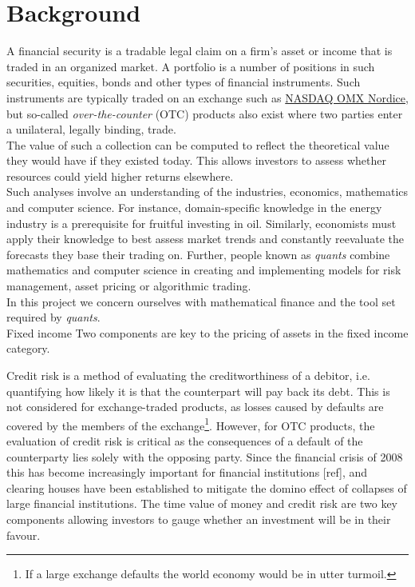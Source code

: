 \chapter{Background}

A financial security is a tradable legal claim on a firm's asset or income 
that is traded in an organized market\cite{alexander2008market}.
A portfolio is  a number of positions in such securities, equities, bonds
and other types of financial instruments. 
Such instruments are typically traded on an exchange such as 
\href{http://www.nasdaqomxnordic.com/}{NASDAQ OMX Nordice}, but so-called
\emph{over-the-counter} (OTC) products also exist where two parties enter
a unilateral, legally binding, trade.\\

The value of such a collection can be computed to reflect the theoretical 
value they would have if they existed today. This allows investors to assess
whether resources could yield higher returns elsewhere.\\

Such analyses involve an understanding of the industries, economics, mathematics
and computer science. For instance, domain-specific knowledge in the energy 
industry is a prerequisite for fruitful investing in oil. Similarly, economists 
must apply their knowledge to best assess market trends and constantly reevaluate
the forecasts they base their trading on.
Further, people known as \emph{quants} combine mathematics and computer science
in creating and implementing models for risk management, asset pricing or 
algorithmic trading.\\

In this project we concern ourselves with mathematical finance and the tool
set required by \emph{quants}.\\

Fixed income
Two components are key to the pricing of assets in the fixed income category.

Credit risk is a method of evaluating the creditworthiness of a debitor, i.e. 
quantifying how likely it is that the counterpart will pay back its debt. This 
is not considered for exchange-traded products, as losses caused by defaults 
are covered by the members of the exchange\footnote{If a large exchange 
defaults the world economy would be in utter turmoil.}. However, for OTC
products, the evaluation of credit risk is critical as the consequences of a 
default of the counterparty lies solely with the opposing party. Since the 
financial crisis of 2008 this has become increasingly important for financial 
institutions [ref], and clearing houses have been established to mitigate the 
domino effect of collapses of large financial institutions.
The time value of money and credit risk are two key components allowing 
investors to gauge whether an investment will be in their favour.\\

